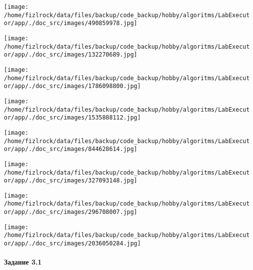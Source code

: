 \documentclass[a4paper, 12pt]{article}
\begin{document}
\texttt{[image: /home/fizlrock/data/files/backup/code\_backup/hobby/algoritms/LabExecutor/app/./doc\_src/images/490859978.jpg]}

\texttt{[image: /home/fizlrock/data/files/backup/code\_backup/hobby/algoritms/LabExecutor/app/./doc\_src/images/132270689.jpg]}

\texttt{[image: /home/fizlrock/data/files/backup/code\_backup/hobby/algoritms/LabExecutor/app/./doc\_src/images/1786098800.jpg]}

\texttt{[image: /home/fizlrock/data/files/backup/code\_backup/hobby/algoritms/LabExecutor/app/./doc\_src/images/1535888112.jpg]}

\texttt{[image: /home/fizlrock/data/files/backup/code\_backup/hobby/algoritms/LabExecutor/app/./doc\_src/images/844628614.jpg]}

\texttt{[image: /home/fizlrock/data/files/backup/code\_backup/hobby/algoritms/LabExecutor/app/./doc\_src/images/327093148.jpg]}

\texttt{[image: /home/fizlrock/data/files/backup/code\_backup/hobby/algoritms/LabExecutor/app/./doc\_src/images/296708007.jpg]}

\texttt{[image: /home/fizlrock/data/files/backup/code\_backup/hobby/algoritms/LabExecutor/app/./doc\_src/images/2036050284.jpg]}
\pagebreak
\paragraph{Задание 3.1}
\end{document}
